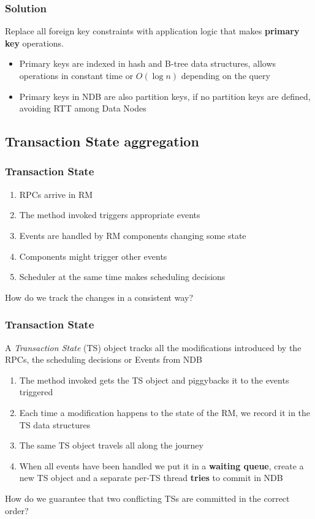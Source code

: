 \documentclass{beamer}
\begin{document}
\begin{frame}
\frametitle{Solution}
Replace all foreign key constraints with application logic that makes
\textbf{primary key} operations.

\begin{itemize}
\item<+-> Primary keys are indexed in hash and B-tree data structures, allows
  operations in constant time or $O(\log{}n)$ depending on the query
\item<+-> Primary keys in NDB are also partition keys, if no partition
  keys are defined, avoiding RTT among Data Nodes
\end{itemize}
\end{frame}

\subsection{Transaction State aggregation}
\begin{frame}
\frametitle{Transaction State}

\begin{enumerate}
\item RPCs arrive in RM
\item The method invoked triggers appropriate events
\item Events are handled by RM components changing some state
\item Components might trigger other events
\item Scheduler at the same time makes scheduling decisions
\end{enumerate}

\pause
\vfill
\centering
{\color{red} How do we track the changes in a consistent way?}
\end{frame}

\begin{frame}
\frametitle{Transaction State}
A \emph{Transaction State} (TS) object tracks all the modifications
introduced by the RPCs, the scheduling decisions or Events from NDB

\begin{enumerate}
\item The method invoked gets the TS object and piggybacks it to the
  events triggered
\item Each time a modification happens to the state of the RM, we record
  it in the TS data structures
\item The same TS object travels all along the journey
\item When all events have been handled we put it in a \textbf{waiting
    queue}, create a new TS object and a separate per-TS thread \textbf{tries} to commit in NDB
\end{enumerate}

\pause
\vfill
\centering
{\color{red} How do we guarantee that two conflicting TSs are
  committed in the correct order?}
\end{frame}
\end{document}
